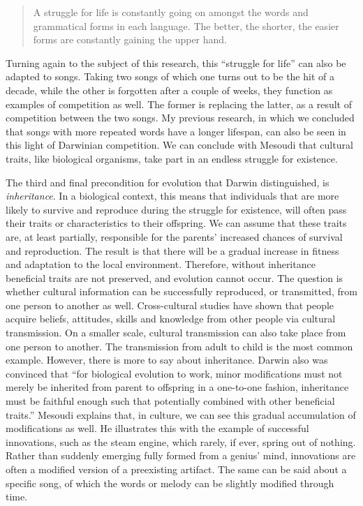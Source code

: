 \begin{quote}
	A struggle for life is constantly going on amongst the words and grammatical forms in each language. The better, the shorter, the easier forms are constantly gaining the upper hand.\autocite[91]{darwin_descent_2003}
\end{quote}

\noindent Turning again to the subject of this research, this \enquote{struggle for life} can also be adapted to songs. Taking two songs of which one turns out to be the hit of a decade, while the other is forgotten after a couple of weeks, they function as examples of competition as well. The former is replacing the latter, as a result of competition between the two songs. My previous research\autocite{lassche_repetition_2019}, in which we concluded that songs with more repeated words have a longer lifespan, can also be seen in this light of Darwinian competition. We can conclude with Mesoudi that cultural traits, like biological organisms, take part in an endless struggle for existence.\autocite[31]{mesoudi_cultural_2011}

The third and final precondition for evolution that Darwin distinguished, is \textit{inheritance}. In a biological context, this means that individuals that are more likely to survive and reproduce during the struggle for existence, will often pass their traits or characteristics to their offspring. We can assume that these traits are, at least partially, responsible for the parents' increased chances of survival and reproduction. The result is that there will be a gradual increase in fitness and adaptation to the local environment. Therefore, without inheritance beneficial traits are not preserved, and evolution cannot occur.\autocite[32]{mesoudi_cultural_2011} The question is whether cultural information can be successfully reproduced, or transmitted, from one person to another as well.\autocite[32]{mesoudi_cultural_2011} Cross-cultural studies have shown that people acquire beliefs, attitudes, skills and knowledge from other people via cultural transmission. On a smaller scale, cultural transmission can also take place from one person to another. The transmission from adult to child is the most common example. However, there is more to say about inheritance. Darwin also was convinced that \enquote{for biological evolution to work, minor modifications must not merely be inherited from parent to offspring in a one-to-one fashion, inheritance must be faithful enough such that potentially combined with other beneficial traits.}\autocite[33]{mesoudi_cultural_2011} Mesoudi explains that, in culture, we can see this gradual accumulation of modifications as well. He illustrates this with the example of successful innovations, such as the steam engine, which rarely, if ever, spring out of nothing. Rather than suddenly emerging fully formed from a genius' mind, innovations are often a modified version of a preexisting artifact.\autocite[33]{mesoudi_cultural_2011} The same can be said about a specific song, of which the words or melody can be slightly modified through time.

